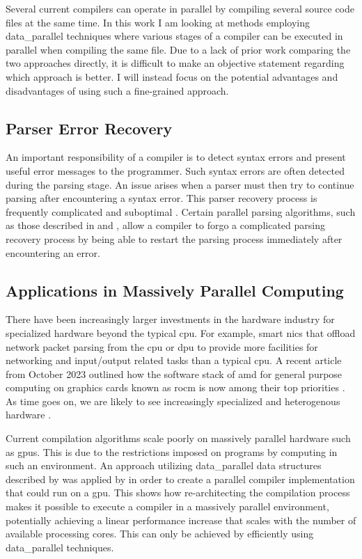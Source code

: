 Several current compilers can operate in parallel by compiling several source
code files at the same time. In this work I am looking at methods employing
\gls{data_parallel} techniques where various stages of a compiler can be executed in
parallel when compiling the same file. Due to a lack of prior work comparing
the two approaches directly, it is difficult to make an objective statement
regarding which approach is better. I will instead focus on the potential
advantages and disadvantages of using such a fine-grained approach.

\subsection{Parser Error Recovery}

An important responsibility of a compiler is to detect syntax errors and
present useful error messages to the programmer. Such syntax errors are often
detected during the parsing stage. An issue arises when a parser must then try
to continue parsing after encountering a syntax error. This parser recovery
process is frequently complicated and suboptimal \citep{medeiros_syntax_2018,
hutchison_pika_2020}. Certain parallel parsing algorithms, such as those
described in \citet{clarke_error_1993} and \cite{barenghi_parallel_2015}, allow
a compiler to forgo a complicated parsing recovery process by being able to
restart the parsing process immediately after encountering an error.

\subsection{Applications in Massively Parallel Computing}

There have been increasingly larger investments in the hardware industry for
specialized hardware beyond the typical \gls{cpu}.  For example, smart \glspl{nic}
 that offload network packet parsing from the \gls{cpu} or \gls{dpu} to provide
more facilities for networking and input/output related tasks than a typical
\gls{cpu}. A recent article from October 2023 outlined how the software stack
of \gls{amd} for general purpose computing on graphics cards known as \gls{rocm}
is now among their top priorities \citep{ward-foxton_rocm_2023}. As time goes
on, we are likely to see increasingly specialized and heterogenous hardware
\citep{stefan_lets_2021}.

Current compilation algorithms scale poorly on massively parallel hardware
such as \glspl{gpu}. This is due to the restrictions imposed on programs by
computing in such an environment. An approach utilizing \gls{data_parallel}
data structures described by \cite{hillis_data_1986} was applied by
\cite{voetter_compilation_2022} in order to create a parallel compiler
implementation that could run on a \gls{gpu}. This shows how  re-architecting
the compilation process makes it possible to execute a compiler in a massively
parallel environment, potentially achieving a linear performance increase that
scales with the number of available processing cores. This can only be achieved
by efficiently using \gls{data_parallel} techniques.

